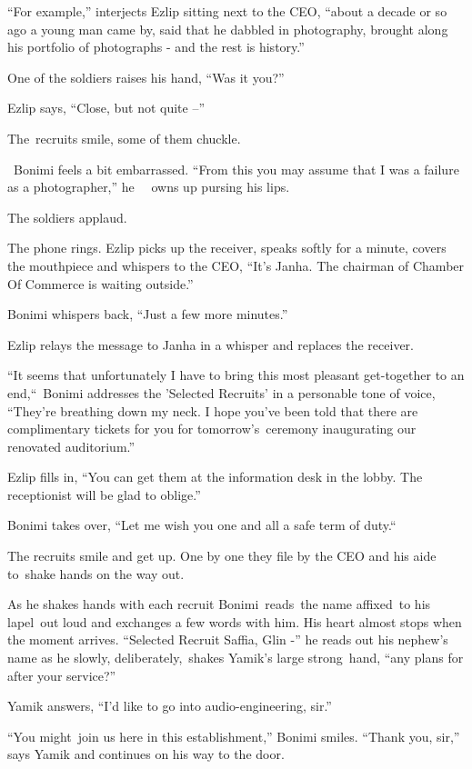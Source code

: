 \documentclass[twoside,11pt]{book}
\begin{document}
``For example,'' interjects Ezlip sitting next to the CEO, ``about a decade or so
ago a young man came by, said that he dabbled in photography, brought along his portfolio of photographs - and the rest
is history.'' 

One of the soldiers raises his hand, ``Was it you?'' \ 

Ezlip says, ``Close, but not quite --'' 

The\ recruits smile, some of them chuckle{.}

~Bonimi feels a bit embarrassed. ``From this you may assume that I was a failure as a
photographer,'' he \ \ owns up pursing his lips. 

The soldiers applaud.~ 

The phone rings. Ezlip picks up the receiver, speaks softly for a minute, covers the mouthpiece and whispers to the CEO,
``It's Janha. The chairman of Chamber Of Commerce is waiting outside.'' 

Bonimi whispers back, ``Just a few more minutes.'' 

Ezlip relays the message to Janha in a whisper and replaces the receiver.

``It seems that unfortunately I have to bring this most pleasant get-together to an
end,``\ Bonimi addresses the 'Selected Recruits' in a personable tone of voice, ``They're
breathing down my neck. I hope you've been told that there are complimentary tickets for you for
tomorrow's{\ }ceremony inaugurating our renovated auditorium.'' 

Ezlip fills in, ``You can get them at the information desk in the lobby. The receptionist will be glad to
oblige.'' 

Bonimi takes over, ``Let me wish you one and all a safe term of duty.``\ 

The recruits smile and get up. One by one they file by the CEO and his aide to~shake hands on the way out. 

As he shakes hands with each recruit Bonimi\ reads\ the name affixed\ to his lapel\ out loud and exchanges a few words
with him. His heart almost stops when the moment arrives. ``Selected Recruit Saffia, Glin -'' he reads out his nephew's
name as he slowly, deliberately,\ shakes Yamik's large strong{\ }hand, ``any
plans for after your service?'' 

Yamik answers, ``I'd like to go into audio-engineering, sir.'' 

``You might\ join us here in this establishment,'' Bonimi smiles. ``Thank you,
sir,'' says Yamik and continues on his way to the door. 
\end{document}
